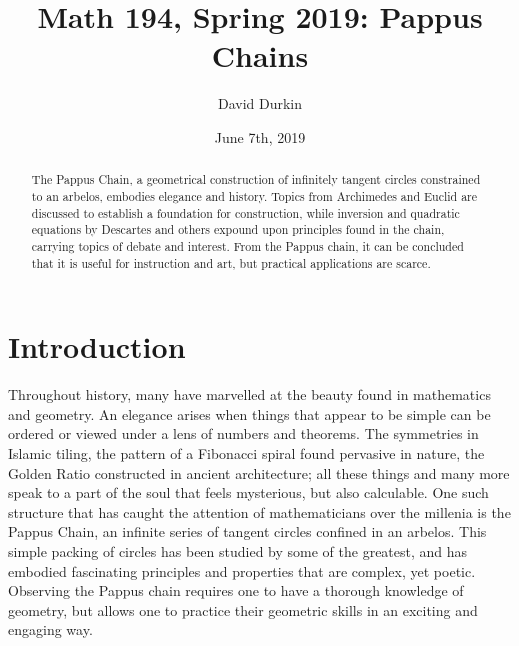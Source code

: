 \documentclass[12pt]{article}
\begin{document}
\title{Math 194, Spring 2019: Pappus Chains}
\author{David Durkin }
\date{June 7th, 2019}


\maketitle

\begin{abstract}
The Pappus Chain, a geometrical construction of infinitely tangent circles constrained to an arbelos, embodies elegance and history. Topics from Archimedes and Euclid are discussed to establish a foundation for construction, while inversion and quadratic equations by Descartes and others expound upon principles found in the chain, carrying topics of debate and interest. From the Pappus chain, it can be concluded that it is useful for instruction and art, but practical applications are scarce.
\end{abstract}

\section{Introduction}
\hspace{\parindent} Throughout history, many have marvelled at the beauty found in mathematics and geometry. An elegance arises when things that appear to be simple can be ordered or viewed under a lens of numbers and theorems. The symmetries in Islamic tiling, the pattern of a Fibonacci spiral found pervasive in nature, the Golden Ratio constructed in ancient architecture; all these things and many more speak to a part of the soul that feels mysterious, but also calculable. One such structure that has caught the attention of mathematicians over the millenia is the Pappus Chain, an infinite series of tangent circles confined in an arbelos. This simple packing of circles has been studied by some of the greatest, and has embodied fascinating principles and properties that are complex, yet poetic. Observing the Pappus chain requires one to have a thorough knowledge of geometry, but allows one to practice their geometric skills in an exciting and engaging way. 
\end{document}
